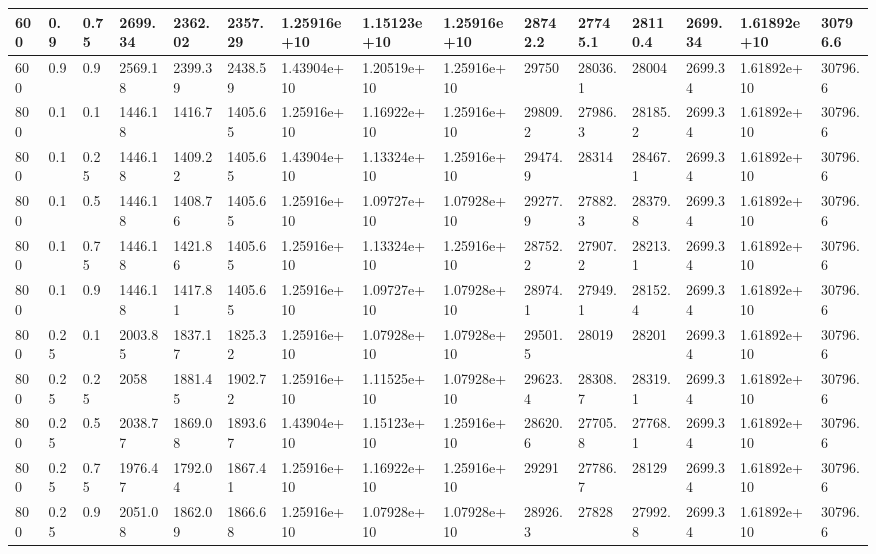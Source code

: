 \begin{table}[!htbp]
\begin{tabularx}{\textwidth}{|p{0.4cm}|*{2}{p{0.2cm}|}*{12}{X|}}
600&0.9&0.75&2699.34&2362.02&2357.29&1.25916e+10&1.15123e+10&1.25916e+10&28742.2&27745.1&28110.4&2699.34&1.61892e+10&30796.6\\\hline
600&0.9&0.9&2569.18&2399.39&2438.59&1.43904e+10&1.20519e+10&1.25916e+10&29750&28036.1&28004&2699.34&1.61892e+10&30796.6\\\hline
800&0.1&0.1&1446.18&1416.7&1405.65&1.25916e+10&1.16922e+10&1.25916e+10&29809.2&27986.3&28185.2&2699.34&1.61892e+10&30796.6\\\hline
800&0.1&0.25&1446.18&1409.22&1405.65&1.43904e+10&1.13324e+10&1.25916e+10&29474.9&28314&28467.1&2699.34&1.61892e+10&30796.6\\\hline
800&0.1&0.5&1446.18&1408.76&1405.65&1.25916e+10&1.09727e+10&1.07928e+10&29277.9&27882.3&28379.8&2699.34&1.61892e+10&30796.6\\\hline
800&0.1&0.75&1446.18&1421.86&1405.65&1.25916e+10&1.13324e+10&1.25916e+10&28752.2&27907.2&28213.1&2699.34&1.61892e+10&30796.6\\\hline
800&0.1&0.9&1446.18&1417.81&1405.65&1.25916e+10&1.09727e+10&1.07928e+10&28974.1&27949.1&28152.4&2699.34&1.61892e+10&30796.6\\\hline
800&0.25&0.1&2003.85&1837.17&1825.32&1.25916e+10&1.07928e+10&1.07928e+10&29501.5&28019&28201&2699.34&1.61892e+10&30796.6\\\hline
800&0.25&0.25&2058&1881.45&1902.72&1.25916e+10&1.11525e+10&1.07928e+10&29623.4&28308.7&28319.1&2699.34&1.61892e+10&30796.6\\\hline
800&0.25&0.5&2038.77&1869.08&1893.67&1.43904e+10&1.15123e+10&1.25916e+10&28620.6&27705.8&27768.1&2699.34&1.61892e+10&30796.6\\\hline
800&0.25&0.75&1976.47&1792.04&1867.41&1.25916e+10&1.16922e+10&1.25916e+10&29291&27786.7&28129&2699.34&1.61892e+10&30796.6\\\hline
800&0.25&0.9&2051.08&1862.09&1866.68&1.25916e+10&1.07928e+10&1.07928e+10&28926.3&27828&27992.8&2699.34&1.61892e+10&30796.6\\\hline
	\end{tabularx}
\end{table}
\FloatBarrier
\clearpage
